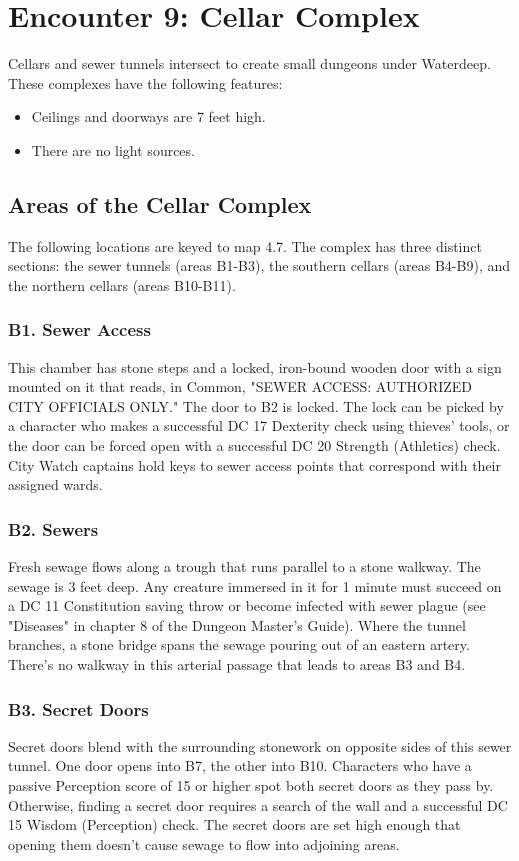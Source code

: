 \documentclass[10pt,a4paper,twoside,twocolumn,openany,nodeprecatedcode]{dndbook}
\begin{document}
\section{Encounter 9: Cellar Complex}
Cellars and sewer tunnels intersect to create small dungeons under Waterdeep. These complexes have the following features:
\begin{itemize}

\item Ceilings and doorways are 7 feet high.
\item There are no light sources.
\end{itemize}


\subsection{Areas of the Cellar Complex}
The following locations are keyed to map 4.7. The complex has three distinct sections: the sewer tunnels (areas B1-B3), the southern cellars (areas B4-B9), and the northern cellars (areas B10-B11).
\subsubsection{B1. Sewer Access}
This chamber has stone steps and a locked, iron-bound wooden door with a sign mounted on it that reads, in Common, "SEWER ACCESS: AUTHORIZED CITY OFFICIALS ONLY." The door to B2 is locked. The lock can be picked by a character who makes a successful DC 17 Dexterity check using thieves' tools, or the door can be forced open with a successful DC 20 Strength (Athletics) check. City Watch captains hold keys to sewer access points that correspond with their assigned wards.
\subsubsection{B2. Sewers}
Fresh sewage flows along a trough that runs parallel to a stone walkway. The sewage is 3 feet deep. Any creature immersed in it for 1 minute must succeed on a DC 11 Constitution saving throw or become infected with sewer plague (see "Diseases" in chapter 8 of the Dungeon Master's Guide).
Where the tunnel branches, a stone bridge spans the sewage pouring out of an eastern artery. There's no walkway in this arterial passage that leads to areas B3 and B4.
\subsubsection{B3. Secret Doors}
Secret doors blend with the surrounding stonework on opposite sides of this sewer tunnel. One door opens into B7, the other into B10. Characters who have a passive Perception score of 15 or higher spot both secret doors as they pass by. Otherwise, finding a secret door requires a search of the wall and a successful DC 15 Wisdom (Perception) check. The secret doors are set high enough that opening them doesn't cause sewage to flow into adjoining areas.
\end{document}
